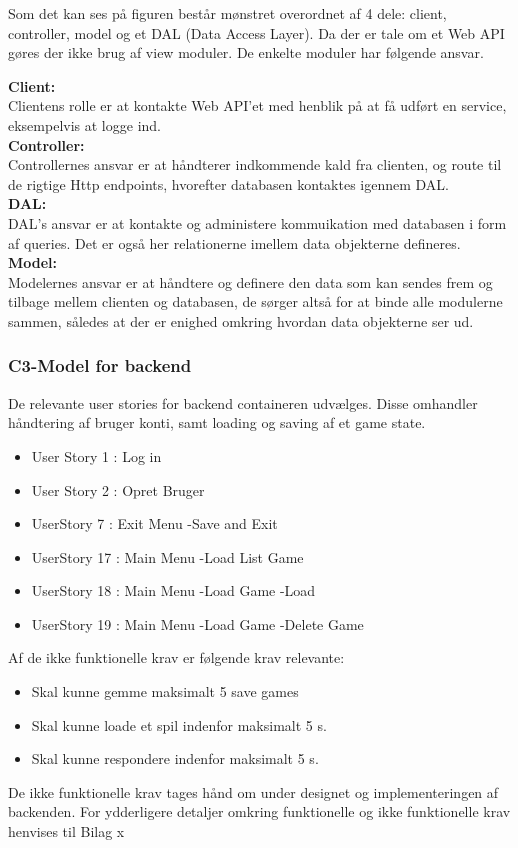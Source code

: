 Som det kan ses på figuren består mønstret overordnet af 4 dele: client, controller, model og et DAL (Data Access Layer). Da der er tale om et Web API gøres der ikke brug af view moduler. De enkelte moduler har følgende ansvar.

\textbf{Client:}\\
Clientens rolle er at kontakte Web API’et med henblik på at få udført en service, eksempelvis at logge ind.\\
\textbf{Controller:}\\
Controllernes ansvar er at håndterer indkommende kald fra clienten, og route til de rigtige Http endpoints, hvorefter databasen kontaktes igennem DAL.\\
\textbf{DAL:}\\
DAL’s ansvar er at kontakte og administere kommuikation med databasen i form af queries. Det er også her relationerne imellem data objekterne defineres.\\
\textbf{Model:}\\
Modelernes ansvar er at håndtere og definere den data som kan sendes frem og tilbage mellem clienten og databasen, de sørger altså for at binde alle modulerne sammen, således at der er enighed omkring hvordan data objekterne ser ud.\\

\subsubsection{C3-Model for backend}

De relevante user stories for backend containeren udvælges. Disse omhandler håndtering af bruger konti, samt loading og saving af et game state.
 
\begin{itemize}
\item User Story 1 : Log in
\item User Story 2 : Opret Bruger
\item UserStory 7 : Exit Menu -\g Save and Exit
\item UserStory 17 : Main Menu -\g Load List Game
\item UserStory 18 : Main Menu -\g Load Game -\g Load
\item UserStory 19 : Main Menu -\g Load Game -\g Delete Game
\end{itemize}
Af de ikke funktionelle krav er følgende krav relevante:
\begin{itemize}
\item Skal kunne gemme maksimalt 5 save games
\item Skal kunne loade et spil indenfor maksimalt 5 s.
\item Skal kunne respondere indenfor maksimalt 5 s.
\end{itemize}
De ikke funktionelle krav tages hånd om under designet og implementeringen af backenden.
For ydderligere detaljer omkring funktionelle og ikke funktionelle krav henvises til Bilag x


